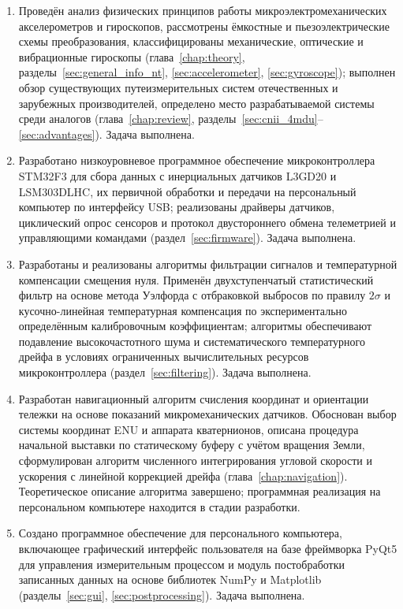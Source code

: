 \begin{enumerate}
	\item Проведён анализ физических принципов работы микроэлектромеханических акселерометров и гироскопов, рассмотрены ёмкостные и пьезоэлектрические схемы преобразования, классифицированы механические, оптические и вибрационные гироскопы (глава~\ref{chap:theory}, разделы~\ref{sec:general_info_nt}, \ref{sec:accelerometer}, \ref{sec:gyroscope}); выполнен обзор существующих путеизмерительных систем отечественных и зарубежных производителей, определено место разрабатываемой системы среди аналогов (глава~\ref{chap:review}, разделы~\ref{sec:cnii_4mdu}--\ref{sec:advantages}). Задача выполнена.
	
	\item Разработано низкоуровневое программное обеспечение микроконтроллера STM32F3 для сбора данных с инерциальных датчиков L3GD20 и LSM303DLHC, их первичной обработки и передачи на персональный компьютер по интерфейсу USB; реализованы драйверы датчиков, циклический опрос сенсоров и протокол двустороннего обмена телеметрией и управляющими командами (раздел~\ref{sec:firmware}). Задача выполнена.
	
	\item Разработаны и реализованы алгоритмы фильтрации сигналов и температурной компенсации смещения нуля. Применён двухступенчатый статистический фильтр на основе метода Уэлфорда с отбраковкой выбросов по правилу $2\sigma$ и кусочно-линейная температурная компенсация по экспериментально определённым калибровочным коэффициентам; алгоритмы обеспечивают подавление высокочастотного шума и систематического температурного дрейфа в условиях ограниченных вычислительных ресурсов микроконтроллера (раздел~\ref{sec:filtering}). Задача выполнена.
	
	\item Разработан навигационный алгоритм счисления координат и ориентации тележки на основе показаний микромеханических датчиков. Обоснован выбор системы координат ENU и аппарата кватернионов, описана процедура начальной выставки по статическому буферу с учётом вращения Земли, сформулирован алгоритм численного интегрирования угловой скорости и ускорения с линейной коррекцией дрейфа (глава~\ref{chap:navigation}). Теоретическое описание алгоритма завершено; программная реализация на персональном компьютере находится в стадии разработки.
	
	\item Создано программное обеспечение для персонального компьютера, включающее графический интерфейс пользователя на базе фреймворка PyQt5 для управления измерительным процессом и модуль постобработки записанных данных на основе библиотек NumPy и Matplotlib (разделы~\ref{sec:gui}, \ref{sec:postprocessing}). Задача выполнена.
	

\end{enumerate}
